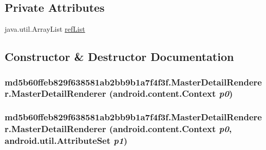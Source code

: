 \subsection*{Private Attributes}
\begin{CompactItemize}
\item 
java.util.ArrayList \hyperlink{classmd5b60ffeb829f638581ab2bb9b1a7f4f3f_1_1_master_detail_renderer_30c285665b3a72e9c0975bf43b4f8210}{refList}
\end{CompactItemize}


\subsection{Constructor \& Destructor Documentation}
\hypertarget{classmd5b60ffeb829f638581ab2bb9b1a7f4f3f_1_1_master_detail_renderer_14ed5c8eab58b78a200c47600daacb7b}{
\subsubsection[{MasterDetailRenderer}]{\setlength{\rightskip}{0pt plus 5cm}md5b60ffeb829f638581ab2bb9b1a7f4f3f.MasterDetailRenderer.MasterDetailRenderer (android.content.Context {\em p0})}}
\label{classmd5b60ffeb829f638581ab2bb9b1a7f4f3f_1_1_master_detail_renderer_14ed5c8eab58b78a200c47600daacb7b}


\hypertarget{classmd5b60ffeb829f638581ab2bb9b1a7f4f3f_1_1_master_detail_renderer_20b50dd51874695ded02789310f2c483}{
\subsubsection[{MasterDetailRenderer}]{\setlength{\rightskip}{0pt plus 5cm}md5b60ffeb829f638581ab2bb9b1a7f4f3f.MasterDetailRenderer.MasterDetailRenderer (android.content.Context {\em p0}, \/  android.util.AttributeSet {\em p1})}}
\label{classmd5b60ffeb829f638581ab2bb9b1a7f4f3f_1_1_master_detail_renderer_20b50dd51874695ded02789310f2c483}


